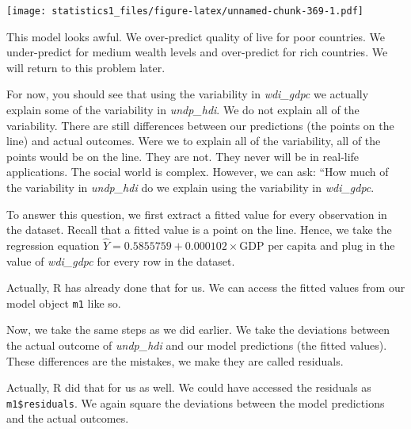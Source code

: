\documentclass[]{article}
\newenvironment{Shaded}{\begin{snugshade}}{\end{snugshade}}
\newcommand{\StringTok}[1]{\textcolor[rgb]{0.31,0.60,0.02}{#1}}
\newcommand{\CommentTok}[1]{\textcolor[rgb]{0.56,0.35,0.01}{\textit{#1}}}
\newcommand{\OperatorTok}[1]{\textcolor[rgb]{0.81,0.36,0.00}{\textbf{#1}}}
\newcommand{\NormalTok}[1]{#1}
\theoremstyle{definition}
\theoremstyle{definition}
\theoremstyle{definition}
\theoremstyle{remark}
\begin{document}
\texttt{[image: statistics1\_files/figure-latex/unnamed-chunk-369-1.pdf]}

This model looks awful. We over-predict quality of live for poor
countries. We under-predict for medium wealth levels and over-predict
for rich countries. We will return to this problem later.

For now, you should see that using the variability in \emph{wdi\_gdpc}
we actually explain some of the variability in \emph{undp\_hdi}. We do
not explain all of the variability. There are still differences between
our predictions (the points on the line) and actual outcomes. Were we to
explain all of the variability, all of the points would be on the line.
They are not. They never will be in real-life applications. The social
world is complex. However, we can ask: ``How much of the variability in
\emph{undp\_hdi} do we explain using the variability in
\emph{wdi\_gdpc}.

To answer this question, we first extract a fitted value for every
observation in the dataset. Recall that a fitted value is a point on the
line. Hence, we take the regression equation
\(\hat{Y} = 0.5855759 + 0.000102 \times \textrm{GDP per capita}\) and
plug in the value of \emph{wdi\_gdpc} for every row in the dataset.

Actually, R has already done that for us. We can access the fitted
values from our model object \texttt{m1} like so.

\begin{Shaded}
\end{Shaded}

Now, we take the same steps as we did earlier. We take the deviations
between the actual outcome of \emph{undp\_hdi} and our model predictions
(the fitted values). These differences are the mistakes, we make they
are called residuals.

\begin{Shaded}
\end{Shaded}

Actually, R did that for us as well. We could have accessed the
residuals as \texttt{m1\$residuals}. We again square the deviations
between the model predictions and the actual outcomes.
\end{document}
